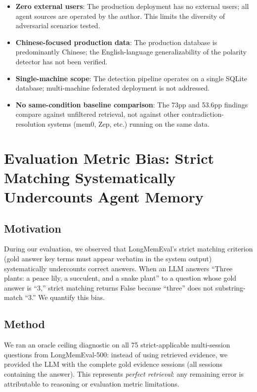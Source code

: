 \documentclass{article}
\begin{document}
\begin{itemize}
\item \textbf{Zero external users}: The production deployment has no external users; all agent sources are operated by the author. This limits the diversity of adversarial scenarios tested.
\item \textbf{Chinese-focused production data}: The production database is predominantly Chinese; the English-language generalizability of the polarity detector has not been verified.
\item \textbf{Single-machine scope}: The detection pipeline operates on a single SQLite database; multi-machine federated deployment is not addressed.
\item \textbf{No same-condition baseline comparison}: The 73pp and 53.6pp findings compare against unfiltered retrieval, not against other contradiction-resolution systems (mem0, Zep, etc.) running on the same data.
\end{itemize}


\section{Evaluation Metric Bias: Strict Matching Systematically Undercounts Agent Memory}
\label{sec:metric_bias}

\subsection{Motivation}

During our evaluation, we observed that LongMemEval's strict matching criterion (gold answer key terms must appear verbatim in the system output) systematically undercounts correct answers. When an LLM answers ``Three plants: a peace lily, a succulent, and a snake plant'' to a question whose gold answer is ``3,'' strict matching returns False because ``three'' does not substring-match ``3.'' We quantify this bias.

\subsection{Method}

We ran an oracle ceiling diagnostic on all 75 strict-applicable multi-session questions from LongMemEval-500: instead of using retrieved evidence, we provided the LLM with the complete gold evidence sessions (all sessions containing the answer). This represents \emph{perfect retrieval}: any remaining error is attributable to reasoning or evaluation metric limitations.
\end{document}
